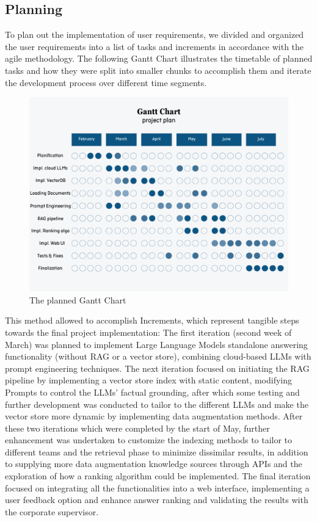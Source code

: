 \subsection{Planning}
To plan out the implementation of user requirements, we divided and organized the user requirements into a list of tasks and increments in accordance with the agile methodology.
The following Gantt Chart illustrates the timetable of planned tasks and how they were split into smaller chunks to accomplish them and iterate the development process over different time segments.
\begin{figure}[H]
    \centering
    \includegraphics[width=\linewidth]{./figures/gantt-chart-1.png}
    \caption{The planned Gantt Chart}
\end{figure}
\begin{flushleft}
    \par This method allowed to accomplish Increments, which represent tangible steps towards the final project implementation: The first iteration (second week of March) was planned to implement Large Language Models standalone answering functionality (without RAG or a vector store), combining cloud-based LLMs with prompt engineering techniques. The next iteration focused on initiating the RAG pipeline by implementing a vector store index with static content, modifying Prompts to control the LLMs' factual grounding, after which some testing and further development was conducted to tailor to the different LLMs and make the vector store more dynamic by implementing data augmentation methods. After these two iterations which were completed by the start of May, further enhancement was undertaken to customize the indexing methods to tailor to different teams and the retrieval phase to minimize dissimilar results, in addition to supplying more data augmentation knowledge sources through APIs and the exploration of how a ranking algorithm could be implemented. The final iteration focused on integrating all the functionalities into a web interface, implementing a user feedback option and enhance answer ranking and validating the results with the corporate supervisor.
\end{flushleft}

